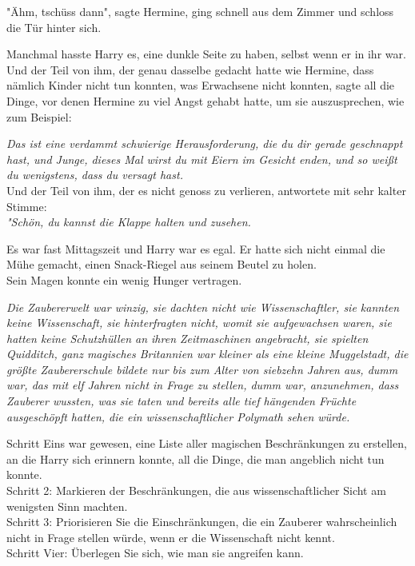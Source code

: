 {"Ähm, tschüss dann", sagte Hermine, ging schnell aus dem Zimmer und schloss die Tür hinter sich.

Manchmal hasste Harry es, eine dunkle Seite zu haben, selbst wenn er in ihr war. Und der Teil von ihm, der genau dasselbe gedacht hatte wie Hermine, dass nämlich Kinder nicht tun konnten, was Erwachsene nicht konnten, sagte all die Dinge, vor denen Hermine zu viel Angst gehabt hatte, um sie auszusprechen, wie zum Beispiel:

\emph{Das ist eine verdammt schwierige Herausforderung, die du dir gerade geschnappt hast, und Junge, dieses Mal wirst du mit Eiern im Gesicht enden, und so weißt du wenigstens, dass du versagt hast.}\\ Und der Teil von ihm, der es nicht genoss zu verlieren, antwortete mit sehr kalter Stimme:\\ \emph{"Schön, du kannst die Klappe halten und zusehen.}

Es war fast Mittagszeit und Harry war es egal. Er hatte sich nicht einmal die Mühe gemacht, einen Snack-Riegel aus seinem Beutel zu holen.\\ Sein Magen konnte ein wenig Hunger vertragen.

\emph{Die Zaubererwelt war winzig, sie dachten nicht wie Wissenschaftler, sie kannten keine Wissenschaft, sie hinterfragten nicht, womit sie aufgewachsen waren, sie hatten keine Schutzhüllen an ihren Zeitmaschinen angebracht, sie spielten Quidditch, ganz magisches Britannien war kleiner als eine kleine Muggelstadt, die größte Zaubererschule bildete nur bis zum Alter von siebzehn Jahren aus, dumm war, das mit elf Jahren nicht in Frage zu stellen, dumm war, anzunehmen, dass Zauberer wussten, was sie taten und bereits alle tief hängenden Früchte ausgeschöpft hatten, die ein wissenschaftlicher Polymath sehen würde.}

Schritt Eins war gewesen, eine Liste aller magischen Beschränkungen zu erstellen, an die Harry sich erinnern konnte, all die Dinge, die man angeblich nicht tun konnte.\\ Schritt 2: Markieren der Beschränkungen, die aus wissenschaftlicher Sicht am wenigsten Sinn machten.\\ Schritt 3: Priorisieren Sie die Einschränkungen, die ein Zauberer wahrscheinlich nicht in Frage stellen würde, wenn er die Wissenschaft nicht kennt.\\ Schritt Vier: Überlegen Sie sich, wie man sie angreifen kann.

}
